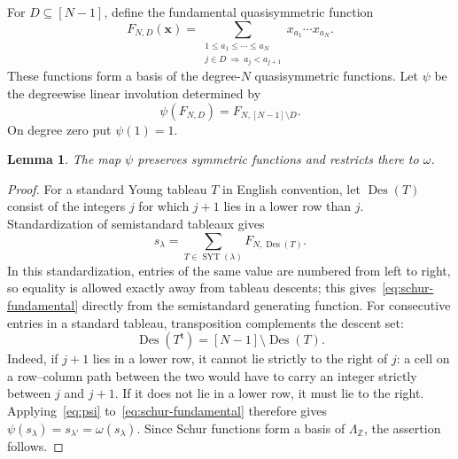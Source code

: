 \documentclass[11pt,reqno]{amsart}
\newcommand{\ZZ}{\mathbb Z}
\newcommand{\xx}{\mathbf x}
\newcommand{\Sym}{\Lambda}
\newcommand{\Des}{\operatorname{Des}}
\newcommand{\SYT}{\operatorname{SYT}}
\newtheorem{lemma}[theorem]{Lemma}
\theoremstyle{definition}
\theoremstyle{remark}
\numberwithin{equation}{section}
\begin{document}
For $D\subseteq[N-1]$, define the fundamental quasisymmetric function
\begin{equation}\label{eq:fundamental}
 F_{N,D}(\xx)
  =\sum_{\substack{1\leq a_1\leq\cdots\leq a_N\\
                  j\in D\ \Rightarrow\ a_j<a_{j+1}}}
          x_{a_1}\cdots x_{a_N}.
\end{equation}
These functions form a basis of the degree-$N$ quasisymmetric functions.
Let $\psi$ be the degreewise linear involution determined by
\begin{equation}\label{eq:psi}
 \psi(F_{N,D})=F_{N,[N-1]\setminus D}.
\end{equation}
On degree zero put $\psi(1)=1$.

\begin{lemma}\label{lem:psi}
The map $\psi$ preserves symmetric functions and restricts there to
$\omega$.
\end{lemma}
\begin{proof}
For a standard Young tableau $T$ in English convention, let $\Des(T)$
consist of the integers $j$ for which $j+1$ lies in a lower row than $j$.
Standardization of semistandard tableaux gives
\begin{equation}\label{eq:schur-fundamental}
 s_\lambda=\sum_{T\in\SYT(\lambda)}F_{N,\Des(T)}.
\end{equation}
In this standardization, entries of the same value are numbered from
left to right, so equality is allowed exactly away from tableau
descents; this gives~\eqref{eq:schur-fundamental} directly from the
semistandard generating function.  For consecutive entries in a
standard tableau, transposition complements the descent set:
\[
 \Des(T^{\mathsf t})=[N-1]\setminus\Des(T).
\]
Indeed, if $j+1$ lies in a lower row, it cannot lie strictly to the
right of $j$: a cell on a row--column path between the two would have
to carry an integer strictly between $j$ and $j+1$.  If it does not
lie in a lower row, it must lie to the right.  Applying~\eqref{eq:psi}
to~\eqref{eq:schur-fundamental} therefore gives
$\psi(s_\lambda)=s_{\lambda'}=\omega(s_\lambda)$.  Since Schur
functions form a basis of $\Sym_\ZZ$, the assertion follows.
\end{proof}
\end{document}
